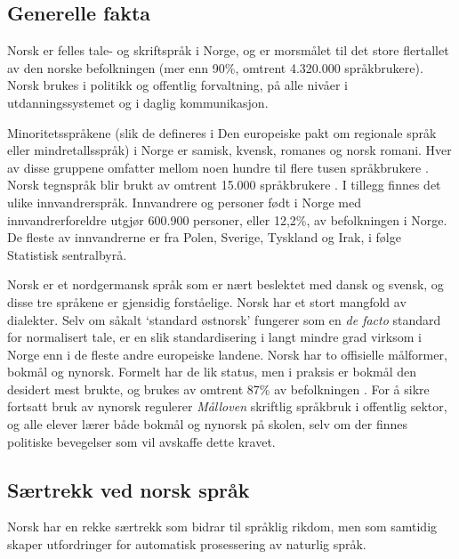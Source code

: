 \begin{multicols}{2}

\subsection{Generelle fakta}

Norsk er felles tale- og skriftspråk i Norge, og er morsmålet til det store flertallet av den norske befolkningen (mer enn 90\%, omtrent 4.320.000 språkbrukere). 
Norsk brukes i politikk og offentlig forvaltning, på alle nivåer i utdanningssystemet og i daglig kommunikasjon. 


Minoritetsspråkene (slik de defineres i Den europeiske pakt om regionale språk eller mindretallsspråk) i Norge er samisk, kvensk, romanes og norsk romani. Hver av disse gruppene omfatter mellom noen hundre til flere tusen språkbrukere \cite{stm35:2008}. 
Norsk tegnspråk blir brukt av omtrent 15.000 språkbrukere \cite{Erl:2007}. 
I tillegg finnes det ulike innvandrerspråk. 
Innvandrere og personer født i Norge med innvandrerforeldre utgjør 600.900 personer, eller 12,2\%, av befolkningen i Norge. De fleste av innvandrerne er fra Polen, Sverige, Tyskland og Irak, i følge Statistisk sentralbyrå.

Norsk er et nordgermansk språk som er nært beslektet med dansk og svensk, og disse tre språkene er gjensidig forståelige. 
Norsk har et stort mangfold av dialekter. 
Selv om såkalt `standard østnorsk' fungerer som en \textit{de facto} standard for normalisert tale, er en slik standardisering i langt mindre grad virksom i Norge enn i de fleste andre europeiske landene.
Norsk har to offisielle målformer, bokmål og nynorsk. Formelt har de lik status, men i praksis er bokmål den desidert mest brukte, og brukes av omtrent 87\% av befolkningen \cite{stm35:2008}. 
For å sikre fortsatt bruk av nynorsk regulerer \textit{Målloven} skriftlig språkbruk i offentlig sektor, og alle elever lærer både bokmål og nynorsk på skolen, selv om der finnes politiske bevegelser som vil avskaffe dette kravet.

\subsection{Særtrekk ved norsk språk}

Norsk har en rekke særtrekk som bidrar til språklig rikdom, men som samtidig skaper utfordringer for automatisk prosessering av naturlig språk.


\end{multicols}
